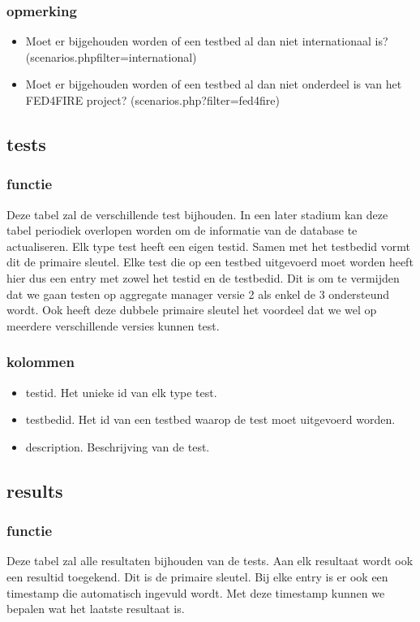 \documentclass[11pt]{article}
\begin{document}
\subsubsection{opmerking}
\begin{itemize}
\item Moet er bijgehouden worden of een testbed al dan niet internationaal is? \\(scenarios.phpfilter=international)
\item Moet er bijgehouden worden of een testbed al dan niet onderdeel is van het FED4FIRE project? (scenarios.php?filter=fed4fire)
\end{itemize}

\subsection{tests}
\subsubsection{functie}
Deze tabel zal de verschillende test bijhouden. In een later stadium kan deze tabel periodiek overlopen worden om de informatie van de database te actualiseren. Elk type test heeft een eigen testid. Samen met het testbedid vormt dit de primaire sleutel. Elke test die op een testbed uitgevoerd moet worden heeft hier dus een entry met zowel het testid en de testbedid. Dit is om te vermijden dat we gaan testen op aggregate manager versie 2 als enkel de 3 ondersteund wordt. Ook heeft deze dubbele primaire sleutel het voordeel dat we wel op meerdere verschillende versies kunnen test.
\subsubsection{kolommen}
\begin{itemize}
\item testid. Het unieke id van elk type test.
\item testbedid. Het id van een testbed waarop de test moet uitgevoerd worden.
\item description. Beschrijving van de test.
\end{itemize}

\subsection{results}
\subsubsection{functie}
Deze tabel zal alle resultaten bijhouden van de tests. Aan elk resultaat wordt ook een resultid toegekend. Dit is de primaire sleutel. Bij elke entry is er ook een timestamp die automatisch ingevuld wordt. Met deze timestamp kunnen we bepalen wat het laatste resultaat is.
\end{document}

